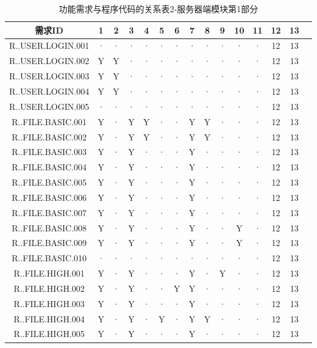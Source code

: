 \begin{table}[htbp]
\centering
\caption{功能需求与程序代码的关系表2-服务器端模块第1部分} \label{tab:requirement-module}
\begin{tabular}{|c|c|c|c|c|c|c|c|c|c|c|c|c|c|c|}
    \hline 
    需求ID & 1 & 2 & 3 & 4 & 5 & 6 & 7 & 8 & 9 & 10 & 11 &12&13\\    
    \hline 
    R..USER.LOGIN.001 &· &· &· &· &· &· &· &· &· &· &· &12&13\\
    \hline
    R..USER.LOGIN.002 &Y&Y&· &· &· &· &· &· &· &· &· &12&13\\
    \hline 
    R..USER.LOGIN.003 &Y&Y&· &· &· &· &· &· &· &· &· &12&13\\
    \hline
    R..USER.LOGIN.004 &Y&Y&· &· &· &· &· &· &· &· &· &12&13\\
    \hline
    R..USER.LOGIN.005 &· &· &· &· &· &· &· &· &· &· &· &12&13\\
    \hline
    R..FILE.BASIC.001 &Y&· &Y&Y&· &· &Y&Y&· &· &· &12&13\\
    \hline
    R..FILE.BASIC.002 &Y&· &Y&Y&· &· &Y&Y&· &· &· &12&13\\
    \hline 
    R..FILE.BASIC.003 &Y&· &Y&· &· &· &Y&· &· &· &· &12&13\\
    \hline
    R..FILE.BASIC.004 &Y&· &Y&· &· &· &Y&· &· &· &· &12&13\\
    \hline
    R..FILE.BASIC.005 &Y&· &Y&· &· &· &Y&· &· &· &· &12&13\\
    \hline
    R..FILE.BASIC.006 &Y&· &Y&· &· &· &Y&· &· &· &· &12&13\\ 
    \hline
    R..FILE.BASIC.007 &Y&· &Y&· &· &· &Y&· &· &· &· &12&13\\
    \hline
    R..FILE.BASIC.008 &Y&· &Y&· &· &· &Y&· &· &Y&· &12&13\\
    \hline
    R..FILE.BASIC.009 &Y&· &Y&· &· &· &Y&· &· &Y&· &12&13\\ 
    \hline
    R..FILE.BASIC.010 &· &· &· &· &· &· &· &· &· &· &· &12&13\\ 
    \hline
    R..FILE.HIGH.001 &Y&· &Y&· &· &· &Y&· &Y&· &· &12&13\\
    \hline
    R..FILE.HIGH.002 &Y&· &Y&· &· &Y&Y&· &· &· &· &12&13\\
    \hline
    R..FILE.HIGH.003 &Y&· &Y&· &· &· &Y&· &· &· &· &12&13\\
    \hline
    R..FILE.HIGH.004 &Y&· &Y&· &Y&· &Y&Y&· &· &· &12&13\\
    \hline
    R..FILE.HIGH.005 &Y&· &Y&· &· &· &Y&· &· &· &· &12&13\\
    \hline
\end{tabular}
\end{table}


